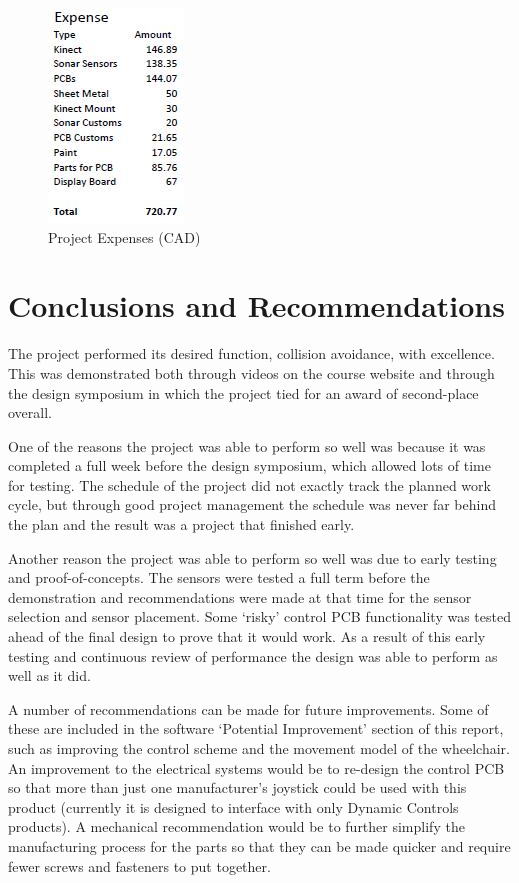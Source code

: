 \documentclass[oneside,final,a4paper]{report}
\begin{document}
\begin{figure}[hbt]
 \centering
 \includegraphics[scale=1]{Project_Expenses}
 \caption{Project Expenses (CAD)}
 \label{fig:costs}
\end{figure}


\chapter{Conclusions and Recommendations}
The project performed its desired function, collision avoidance, with excellence. This was demonstrated both through videos on the course website and through the design symposium in which the project tied for an award of second-place overall.

One of the reasons the project was able to perform so well was because it was completed a full week before the design symposium, which allowed lots of time for testing. The schedule of the project did not exactly track the planned work cycle, but through good project management the schedule was never far behind the plan and the result was a project that finished early.

Another reason the project was able to perform so well was due to early testing and proof-of-concepts. The sensors were tested a full term before the demonstration and recommendations were made at that time for the sensor selection and sensor placement. Some `risky' control PCB functionality was tested ahead of the final design to prove that it would work. As a result of this early testing and continuous review of performance the design was able to perform as well as it did.

A number of recommendations can be made for future improvements. Some of these are included in the software `Potential Improvement' section of this report, such as improving the control scheme and the movement model of the wheelchair. An improvement to the electrical systems would be to re-design the control PCB so that more than just one manufacturer's joystick could be used with this product (currently it is designed to interface with only Dynamic Controls products). A mechanical recommendation would be to further simplify the manufacturing process for the parts so that they can be made quicker and require fewer screws and fasteners to put together.
\end{document}
